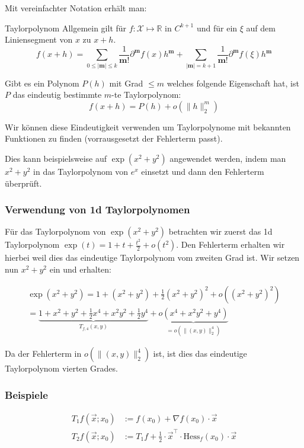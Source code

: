 \documentclass[a4paper,10pt]{article}
\def\R{\mathbb{R}}
\def\X{\mathcal{X}}
\begin{document}
Mit vereinfachter Notation erhält man:

\begin{mainbox}{Taylorpolynom}
  Allgemein gilt für $f: \X \mapsto \R$ in $C^{k+1}$ und für ein $\xi$ auf dem Liniensegment von $x$ zu $x + h$.
  $$f(x + h) = \sum_{0 \leq | \mathbf{m} | \leq k} \frac{1}{\mathbf{m}!} \partial^\mathbf{m} f(x) h^\mathbf{m} + \sum_{| \mathbf{m}| = k + 1} \frac{1}{\mathbf{m}!} \partial^\mathbf{m} f(\xi) h^\mathbf{m}$$
\end{mainbox}

Gibt es ein Polynom $P(h)$ mit Grad $\leq m$ welches folgende Eigenschaft hat, ist $P$ das eindeutig bestimmte $m$-te Taylorpolynom:
$$f(x + h) = P(h) + o(\lVert h \rVert_2^m)$$

Wir können diese Eindeutigkeit verwenden um Taylorpolynome mit bekannten Funktionen zu finden (vorrausgesetzt der Fehlerterm passt). 

Dies kann beispielsweise auf $\exp(x^2 + y^2)$ angewendet werden, indem man $x^2 + y^2$ in das Taylorpolynom von $e^x$ einsetzt und dann den Fehlerterm überprüft.

\subsubsection*{Verwendung von 1d Taylorpolynomen}

Für das Taylorpolynom von $\exp(x^2 + y^2)$ betrachten wir zuerst das 1d Taylorpolynom $\exp(t) = 1 + t + \frac{t^2}{2} + o(t^2)$. Den Fehlerterm erhalten wir hierbei weil dies das eindeutige Taylorpolynom vom zweiten Grad ist. Wir setzen nun $x^2 + y^2$ ein und erhalten:

\begin{align*}
  \exp(x^2 + y^2) = 1 + (x^2 + y^2) + \frac{1}{2} (x^2 + y^2)^2 + o((x^2 + y^2)^2)\\
    = \underbrace{1 + x^2 + y^2 + \frac{1}{2} x^4 + x^2 y^2 + \frac{1}{2} y^4}_{T_{f,4}(x,y)} + \underbrace{o(x^4 + x^2 y^2 + y^4)}_{= o(\lVert (x,y) \rVert_2^4)}
\end{align*}

Da der Fehlerterm in $o(\lVert (x,y) \rVert_2^4)$ ist, ist dies das eindeutige Taylorpolynom vierten Grades.

\subsubsection*{Beispiele}

\begin{align*}
  T_1 f(\vec{x}; x_0) &:= f(x_0) + \nabla f(x_0) \cdot \vec{x} \\
  T_2 f(\vec{x}; x_0) &:= T_1f + \frac{1}{2} \cdot \vec{x}^\top \cdot \text{Hess}_f(x_0) \cdot \vec{x}
\end{align*}
\end{document}

